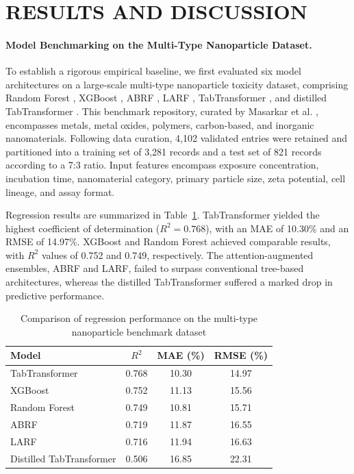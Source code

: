 \section{RESULTS AND DISCUSSION}

\paragraph{Model Benchmarking on the Multi-Type Nanoparticle Dataset.}
To establish a rigorous empirical baseline, we first evaluated six model architectures on a large-scale multi-type nanoparticle toxicity dataset, comprising Random Forest \cite{breiman2001random}, XGBoost \cite{chen2016xgboost}, ABRF \cite{gromov2022attention}, LARF \cite{gromov2022larf}, TabTransformer \cite{huang2020tabtransformer}, and distilled TabTransformer \cite{hinton2015distilling}. This benchmark repository, curated by Masarkar et al. \cite{masarkar2024}, encompasses metals, metal oxides, polymers, carbon-based, and inorganic nanomaterials. Following data curation, 4,102 validated entries were retained and partitioned into a training set of 3,281 records and a test set of 821 records according to a 7:3 ratio. Input features encompass exposure concentration, incubation time, nanomaterial category, primary particle size, zeta potential, cell lineage, and assay format.

Regression results are summarized in Table~\ref{tab:benchmark_regression}. TabTransformer yielded the highest coefficient of determination ($R^2 = 0.768$), with an MAE of 10.30\% and an RMSE of 14.97\%. XGBoost and Random Forest achieved comparable results, with $R^2$ values of 0.752 and 0.749, respectively. The attention-augmented ensembles, ABRF and LARF, failed to surpass conventional tree-based architectures, whereas the distilled TabTransformer suffered a marked drop in predictive performance.

\begin{table}[htbp]
  \centering
  \caption{Comparison of regression performance on the multi-type nanoparticle benchmark dataset}
  \label{tab:benchmark_regression}
  \begin{tabular}{lccc}
    \hline
    Model & $R^2$ & MAE (\%) & RMSE (\%) \\
    \hline
    TabTransformer & 0.768 & 10.30 & 14.97 \\
    XGBoost & 0.752 & 11.13 & 15.56 \\
    Random Forest & 0.749 & 10.81 & 15.71 \\
    ABRF & 0.719 & 11.87 & 16.55 \\
    LARF & 0.716 & 11.94 & 16.63 \\
    Distilled TabTransformer & 0.506 & 16.85 & 22.31 \\
    \hline
  \end{tabular}
\end{table}

